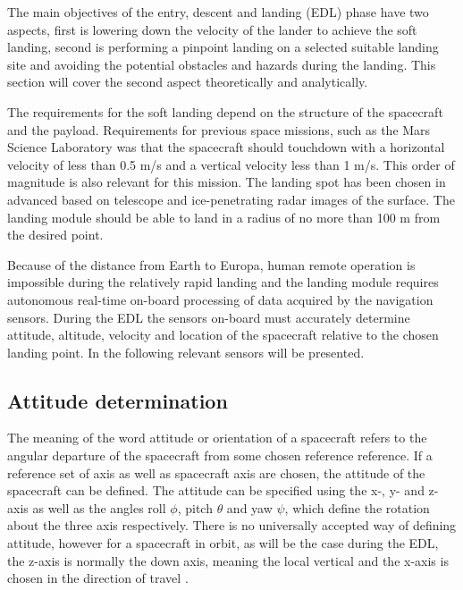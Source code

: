 
The main objectives of the entry, descent and landing (EDL) phase have two aspects, first is lowering down the velocity of the lander to achieve the soft landing, second is performing a pinpoint landing on a selected suitable landing site and avoiding the potential obstacles and hazards during the landing. This section will cover the second aspect theoretically and analytically. 

The requirements for the soft landing depend on the structure of the spacecraft and the payload. Requirements for previous space missions, such as the Mars Science Laboratory was that the spacecraft should touchdown with a horizontal velocity of less than 0.5 m/s and a vertical velocity less than 1 m/s. This order of magnitude is also relevant for this mission. The landing spot has been chosen in advanced based on telescope and ice-penetrating radar images of the surface. The landing module should be able to land in a radius of no more than 100 m from the desired point. 

Because of the distance from Earth to Europa, human remote operation is impossible during the relatively rapid landing and the landing module requires autonomous real-time on-board processing of data acquired by the navigation sensors. During the EDL the sensors on-board must accurately determine attitude, altitude, velocity and location of the spacecraft relative to the chosen landing point. In the following relevant sensors will be presented. 

\subsection{Attitude determination}

The meaning of the word attitude or orientation of a spacecraft refers to the angular departure of the spacecraft from some chosen reference reference. If a reference set of axis as well as spacecraft axis are chosen, the attitude of the spacecraft can be defined. The attitude can be specified using the x-, y- and z- axis as well as the angles roll $\phi$, pitch $\theta$ and yaw $\psi$, which define the rotation about the three axis respectively. There is no universally accepted way of defining attitude, however for a spacecraft in orbit, as will be the case during the EDL, the z-axis is normally the down axis, meaning the local vertical and the x-axis is chosen in the direction of travel \cite{spacecraft}.


